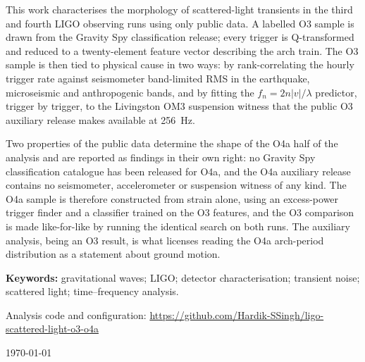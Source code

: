 \begin{titlepage}
\begin{minipage}{0.85\textwidth}
This work characterises the morphology of scattered-light transients in the
third and fourth LIGO observing runs using only public data. A labelled O3
sample is drawn from the Gravity Spy classification release; every trigger is
Q-transformed and reduced to a twenty-element feature vector describing the
arch train. The O3 sample is then tied to physical cause in two ways: by
rank-correlating the hourly trigger rate against seismometer band-limited RMS
in the earthquake, microseismic and anthropogenic bands, and by fitting the
$f_n = 2n|v|/\lambda$ predictor, trigger by trigger, to the Livingston OM3
suspension witness that the public O3 auxiliary release makes available at
\SI{256}{\hertz}.

Two properties of the public data determine the shape of the O4a half of the
analysis and are reported as findings in their own right: no Gravity Spy
classification catalogue has been released for O4a, and the O4a auxiliary
release contains no seismometer, accelerometer or suspension witness of any
kind. The O4a sample is therefore constructed from strain alone, using an
excess-power trigger finder and a classifier trained on the O3 features, and
the O3 comparison is made like-for-like by running the identical search on
both runs. The auxiliary analysis, being an O3 result, is what licenses
reading the O4a arch-period distribution as a statement about ground motion.

\vspace{0.6em}
\noindent\textbf{Keywords:} gravitational waves; LIGO; detector
characterisation; transient noise; scattered light; time--frequency analysis.
\end{minipage}

\vfill
{\small Analysis code and configuration:
\url{https://github.com/Hardik-SSingh/ligo-scattered-light-o3-o4a}\par}
\vspace{0.4em}
{\small \today\par}
\end{titlepage}
